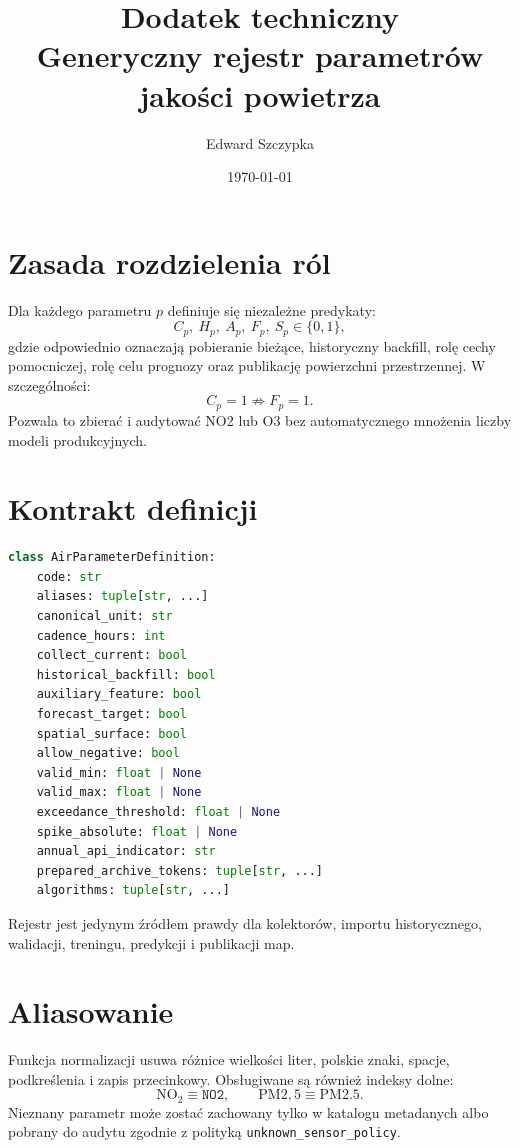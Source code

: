 \documentclass[11pt,a4paper]{article}
\title{Dodatek techniczny\\Generyczny rejestr parametrów jakości powietrza}
\author{Edward Szczypka}
\date{\today}
\begin{document}
\maketitle

\section{Zasada rozdzielenia ról}

Dla każdego parametru $p$ definiuje się niezależne predykaty:
\[
 C_p,\ H_p,\ A_p,\ F_p,\ S_p\in\{0,1\},
\]
gdzie odpowiednio oznaczają pobieranie bieżące, historyczny backfill, rolę
cechy pomocniczej, rolę celu prognozy oraz publikację powierzchni
przestrzennej. W szczególności:
\[
 C_p=1\not\Rightarrow F_p=1.
\]
Pozwala to zbierać i audytować NO2 lub O3 bez automatycznego mnożenia liczby
modeli produkcyjnych.

\section{Kontrakt definicji}

\begin{lstlisting}[language=Python]
class AirParameterDefinition:
    code: str
    aliases: tuple[str, ...]
    canonical_unit: str
    cadence_hours: int
    collect_current: bool
    historical_backfill: bool
    auxiliary_feature: bool
    forecast_target: bool
    spatial_surface: bool
    allow_negative: bool
    valid_min: float | None
    valid_max: float | None
    exceedance_threshold: float | None
    spike_absolute: float | None
    annual_api_indicator: str
    prepared_archive_tokens: tuple[str, ...]
    algorithms: tuple[str, ...]
\end{lstlisting}

Rejestr jest jedynym źródłem prawdy dla kolektorów, importu historycznego,
walidacji, treningu, predykcji i publikacji map.

\section{Aliasowanie}

Funkcja normalizacji usuwa różnice wielkości liter, polskie znaki, spacje,
podkreślenia i zapis przecinkowy. Obsługiwane są również indeksy dolne:
\[
 \mathrm{NO_2}\equiv\texttt{NO2},\qquad
 \mathrm{PM2,5}\equiv\mathrm{PM2.5}.
\]
Nieznany parametr może zostać zachowany tylko w katalogu metadanych albo
pobrany do audytu zgodnie z polityką \texttt{unknown\_sensor\_policy}.
\end{document}
